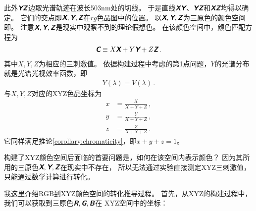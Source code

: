 此外$\compcolor{YZ}$边取光谱轨迹在波长503nm处的切线。
于是直线$\compcolor{XY}$、$\compcolor{YZ}$和$\compcolor{XZ}$均得以确定。
它们的交点即$\compcolor{X},\compcolor{Y},\compcolor{Z}$在$rg$色品图中的位置。
以$\compcolor{X},\compcolor{Y},\compcolor{Z}$为三原色的颜色空间
即。
注意$\compcolor{X},\compcolor{Y},\compcolor{Z}$是现实中观察不到的理论假想色。
在该颜色空间中，颜色匹配方程为
\begin{align}
      \compcolor{C}\equiv X\compcolor{X}+Y\compcolor{Y}+Z\compcolor{Z}\, .
\end{align}
其中$X,Y,Z$为相应的三刺激值。
依据构建过程中考虑的第1点问题，$Y$的光谱分布就是光谱光视效率函数，即
\begin{align}
      Y(\lambda)=V(\lambda)\, .
\end{align}
与$X,Y,Z$对应的XYZ色品坐标为
\begin{align}
      x & =\frac{X}{X+Y+Z}\, , \\
      y & =\frac{Y}{X+Y+Z}\, , \\
      z & =\frac{Z}{X+Y+Z}\, .
\end{align}
它同样满足推论\ref{corollary:chromaticity}，即$x+y+z=1$。

构建了XYZ颜色空间后面临的首要问题是，如何在该空间内表示颜色？
因为其所用的三原色$\compcolor{X},\compcolor{Y},\compcolor{Z}$在现实中不存在，
所以无法通过实验直接测定XYZ三刺激值，只能通过数学计算进行转化。

我这里介绍RGB到XYZ颜色空间的转化推导过程。
首先，从XYZ的构建过程中，我们可以获取到三原色$\compcolor{R},\compcolor{G},\compcolor{B}$在
XYZ空间中的坐标：
